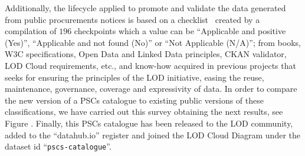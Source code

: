Additionally, the lifecycle applied to promote and validate the data generated from public procurements notices is based on 
a checklist~\cite{} created by a compilation of $196$ checkpoints which a value can be ``Applicable and positive (Yes)'', ``Applicable and not found (No)'' or ``Not Applicable (N/A)''; 
from books, W3C specifications, Open Data and Linked Data principles, CKAN validator, LOD Cloud requirements, etc., 
and know-how acquired in previous projects that seeks for ensuring the principles of the LOD initiative, 
easing the reuse, maintenance, governance, coverage and expressivity of data. 
In order to compare the new version of a PSCs catalogue to existing public versions of these classifications, 
we have carried out this survey obtaining the next results, see Figure . Finally, this PSCs catalogue has been released to the LOD community, added to the ``datahub.io'' 
register and joined the LOD Cloud Diagram under the dataset id ``\texttt{pscs-catalogue}''.


